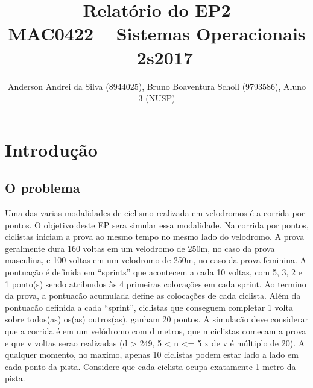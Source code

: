 \documentclass[12pt,a4paper]{article}
\title{Relatório do EP2\\MAC0422 -- Sistemas Operacionais -- 2s2017}
\author{Anderson Andrei da Silva (8944025), Bruno Boaventura Scholl (9793586), Aluno 3 (NUSP)}
\date{}
\begin{document}
\maketitle

\section{Introdução}

\subsection{O problema}

	Uma das varias modalidades de ciclismo realizada em velodromos é a corrida por pontos. O objetivo deste EP sera simular essa modalidade.
Na corrida por pontos, ciclistas iniciam a prova ao mesmo tempo no mesmo lado do velodromo.
	A prova geralmente dura 160 voltas em um velodromo de 250m, no caso da prova masculina, e 100
voltas em um velodromo de 250m, no caso da prova feminina. A pontuação é definida em “sprints”
que acontecem a cada 10 voltas, com 5, 3, 2 e 1 ponto(s) sendo atribuıdos às 4 primeiras colocações em cada sprint. Ao termino da prova, a pontuacão acumulada define as colocações de cada ciclista. Além da pontuacão definida a cada “sprint”, ciclistas que conseguem completar 1 volta sobre todos(as) os(as) outros(as), ganham 20 pontos.
	A simulacão deve considerar que a corrida é em um velódromo com d metros, que n ciclistas
comecam a prova e que v voltas serao realizadas (d > 249, 5 < n <= 5 x de v é múltiplo de 20).
A qualquer momento, no maximo, apenas 10 ciclistas podem estar lado a lado em cada ponto da pista.
Considere que cada ciclista ocupa exatamente 1 metro da pista.


\end{document}
